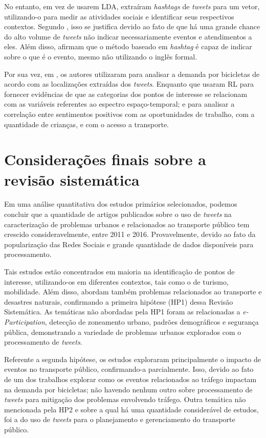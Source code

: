 \documentclass[
	12pt,				%
	oneside,			%
	a4paper,			%
	english,			%
	brazil				%
	]{abntex2ppgsi}
\begin{document}
{{{No entanto, \cite{Ni2016} em vez de usarem LDA, extraíram \textit{hashtags} de \textit{tweets} para um vetor, utilizando-o para medir as atividades sociais e identificar seus respectivos contextos. Segundo \cite{Ni2016}, isso se justifica devido ao fato de que há uma grande chance do alto volume de \textit{tweets} não indicar necessariamente eventos e atendimentos a eles. Além disso, afirmam que o método baseado em \textit{hashtag} é capaz de indicar sobre o que é o evento, mesmo não utilizando o inglês formal.

Por sua vez, em \cite{Gutev2016}, os autores utilizaram  para analisar a demanda por bicicletas de acordo com as localizações extraídas dos \textit{tweets}. Enquanto que \cite{Bendler2014} usaram RL para fornecer evidências de que as categorias dos pontos de interesse se relacionam com as variáveis referentes ao espectro espaço-temporal; e \cite{Guo2016} para analisar a correlação entre sentimentos positivos com as oportunidades de trabalho, com a quantidade de crianças, e com o acesso a transporte. 

\section{Considerações finais sobre a revisão sistemática}
\label{conclusao}
Em uma análise quantitativa dos estudos primários selecionados, podemos concluir que a quantidade de artigos publicados sobre o uso de \textit{tweets} na caracterização de problemas urbanos e relacionados ao transporte público tem crescido consideravelmente, entre 2011 e 2016. Provavelmente, devido ao fato da popularização das Redes Sociais e grande quantidade de dados disponíveis para processamento.

Tais estudos estão concentrados em maioria na identificação de pontos de interesse, utilizando-os em diferentes contextos, tais como o de turismo, mobilidade. Além disso, abordam também problemas relacionados ao transporte e desastres naturais, confirmando a primeira hipótese (HP1) dessa Revisão Sistemática. As temáticas não abordadas pela HP1 foram as relacionadas a \textit{e-Participation}, detecção de zoneamento urbano, padrões demográficos e segurança pública, demonstrando a variedade de problemas urbanos explorados com o processamento de \textit{tweets}.

Referente a segunda hipótese, os estudos exploraram principalmente o impacto de eventos no transporte público, confirmando-a parcialmente. Isso, devido ao fato de um dos trabalhos explorar como os eventos relacionados ao tráfego impactam na demanda por bicicletas; não havendo nenhum outro sobre processamento de \textit{tweets} para mitigação dos problemas envolvendo tráfego. Outra temática não mencionada pela HP2 e sobre a qual há uma quantidade considerável de estudos, foi a do uso de \textit{tweets} para o planejamento e gerenciamento do transporte público.

}}}
\end{document}
